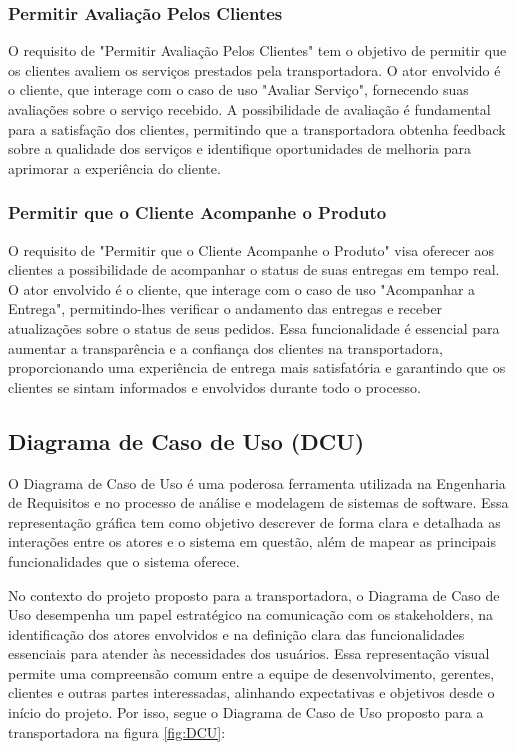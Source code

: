 \subsubsection{Permitir Avaliação Pelos Clientes}

O requisito de "Permitir Avaliação Pelos Clientes" tem o objetivo de permitir que os clientes avaliem os serviços prestados pela transportadora. O ator envolvido é o cliente, que interage com o caso de uso "Avaliar Serviço", fornecendo suas avaliações sobre o serviço recebido. A possibilidade de avaliação é fundamental para a satisfação dos clientes, permitindo que a transportadora obtenha feedback sobre a qualidade dos serviços e identifique oportunidades de melhoria para aprimorar a experiência do cliente.

\subsubsection{Permitir que o Cliente Acompanhe o Produto}

O requisito de "Permitir que o Cliente Acompanhe o Produto" visa oferecer aos clientes a possibilidade de acompanhar o status de suas entregas em tempo real. O ator envolvido é o cliente, que interage com o caso de uso "Acompanhar a Entrega", permitindo-lhes verificar o andamento das entregas e receber atualizações sobre o status de seus pedidos. Essa funcionalidade é essencial para aumentar a transparência e a confiança dos clientes na transportadora, proporcionando uma experiência de entrega mais satisfatória e garantindo que os clientes se sintam informados e envolvidos durante todo o processo.

\subsection{Diagrama de Caso de Uso (DCU)}

O Diagrama de Caso de Uso é uma poderosa ferramenta utilizada na Engenharia de Requisitos e no processo de análise e modelagem de sistemas de software. Essa representação gráfica tem como objetivo descrever de forma clara e detalhada as interações entre os atores e o sistema em questão, além de mapear as principais funcionalidades que o sistema oferece.

No contexto do projeto proposto para a transportadora, o Diagrama de Caso de Uso desempenha um papel estratégico na comunicação com os stakeholders, na identificação dos atores envolvidos e na definição clara das funcionalidades essenciais para atender às necessidades dos usuários. Essa representação visual permite uma compreensão comum entre a equipe de desenvolvimento, gerentes, clientes e outras partes interessadas, alinhando expectativas e objetivos desde o início do projeto. Por isso, segue o Diagrama de Caso de Uso proposto para a transportadora na figura \ref{fig:DCU}:

